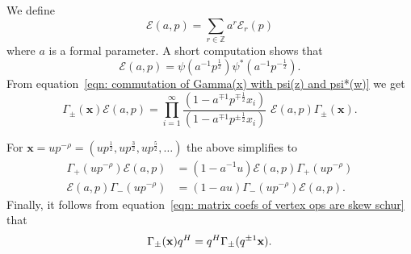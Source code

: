 \documentclass[12pt]{amsart}
\newcommand{\znums} {{\mathbb Z}}		%
\newcommand{\half}{\frac{1}{2}}
\theoremstyle{definition}
\newcommand{\E}{\mathcal{E}}
\newcommand{\ptotheminusrho}{p^{-\rho}}
\begin{document}
We define
\[
\E (a,p) = \sum_{r\in \znums} a^{r} \E_{r}(p)
\]
where $a$ is a formal parameter. A short computation shows that 
\[
\E (a,p) = \psi (a^{-1}p^{\half})\psi^{*} (a^{-1}p^{-\half}).
\]
From equation~\eqref{eqn: commutation of Gamma(x) with psi(z) and
psi*(w)} we get
\[
\Gamma_{\pm}(\mathbf{x})\E (a,p) =\prod_{i=1}^{\infty}\frac{(1-a^{\mp
1}p^{\mp \half}x_{i})}{(1-a^{\mp
1}p^{\pm \half}x_{i})}\,\, \E (a,p)\Gamma_{\pm}(\mathbf{x}). 
\]

For
$\mathbf{x}=u\ptotheminusrho =(up^{\frac{1}{2}},up^{\frac{3}{2}},up^{\frac{5}{2}},\dots )
$ the above simplifies to 
\begin{align}\label{eqn: commutation of Gamma+- with E(a,p)}
\Gamma_{+}(u\ptotheminusrho ) \E (a,p) &= (1-a^{-1}u) \E (a,p) \Gamma_{+}(u\ptotheminusrho )\\
\E (a,p) \Gamma_{-}(u\ptotheminusrho ) &= (1-au) \Gamma_{-}(u\ptotheminusrho )
\E (a,p). \nonumber
\end{align}
Finally, it follows from equation~\eqref{eqn: matrix coefs of vertex
ops are skew schur} that
\begin{equation}\label{eqn: commutation of Gamma and q^{H}}
\Gamma_{\pm}(\mathbf{x})q^{H} = q^{H} \Gamma_{\pm}(q^{\pm 1}\mathbf{x}). 
\end{equation}
\end{document}
